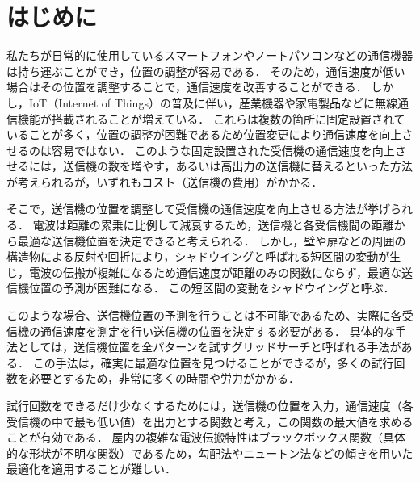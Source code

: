 \documentclass[twocolumn]{ltjarticle}
\begin{document}



\section{はじめに}
私たちが日常的に使用しているスマートフォンやノートパソコンなどの通信機器は持ち運ぶことができ，位置の調整が容易である．
そのため，通信速度が低い場合はその位置を調整することで，通信速度を改善することができる．
しかし，IoT（Internet of Things）の普及に伴い，産業機器や家電製品などに無線通信機能が搭載されることが増えている\cite{soumu}．
これらは複数の箇所に固定設置されていることが多く，位置の調整が困難であるため位置変更により通信速度を向上させるのは容易ではない．
このような固定設置された受信機の通信速度を向上させるには，送信機の数を増やす，あるいは高出力の送信機に替えるといった方法が考えられるが，いずれもコスト（送信機の費用）がかかる．

そこで，送信機の位置を調整して受信機の通信速度を向上させる方法が挙げられる．
電波は距離の累乗に比例して減衰するため，送信機と各受信機間の距離から最適な送信機位置を決定できると考えられる．
しかし，壁や扉などの周囲の構造物による反射や回折により，シャドウイングと呼ばれる短区間の変動が生じ，電波の伝搬が複雑になるため通信速度が距離のみの関数にならず，最適な送信機位置の予測が困難になる．
この短区間の変動をシャドウイングと呼ぶ．

このような場合、送信機位置の予測を行うことは不可能であるため、実際に各受信機の通信速度を測定を行い送信機の位置を決定する必要がある．
具体的な手法としては，送信機位置を全パターンを試すグリッドサーチと呼ばれる手法がある．
この手法は，確実に最適な位置を見つけることができるが，多くの試行回数を必要とするため，非常に多くの時間や労力がかかる．

試行回数をできるだけ少なくするためには，送信機の位置を入力，通信速度（各受信機の中で最も低い値）を出力とする関数と考え，この関数の最大値を求めることが有効である．
屋内の複雑な電波伝搬特性はブラックボックス関数（具体的な形状が不明な関数）であるため，勾配法やニュートン法などの傾きを用いた最適化を適用することが難しい．
\end{document}
